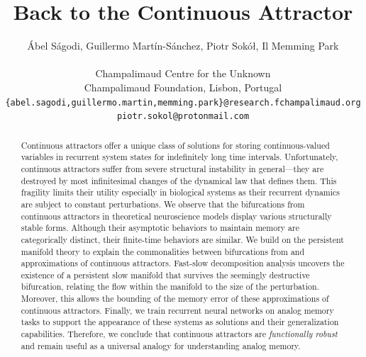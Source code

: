 \documentclass{article} %
\title{Back to the Continuous Attractor}
\author{
    \'Abel S\'agodi, Guillermo Mart\'in-S\'anchez, Piotr Sok\'o\l, Il Memming Park \\
    \\
    Champalimaud Centre for the Unknown\\
    Champalimaud Foundation, Lisbon, Portugal\\
    \texttt{\{abel.sagodi,guillermo.martin,memming.park\}@research.fchampalimaud.org}\\
    \texttt{piotr.sokol@protonmail.com}
}
\newcounter{ct}
\theoremstyle{definition}
\theoremstyle{remark}
\begin{document}


\maketitle

\begin{abstract}
Continuous attractors offer a unique class of solutions for storing continuous-valued variables in recurrent system states for indefinitely long time intervals.
Unfortunately, continuous attractors suffer from severe structural instability in general---they are destroyed by most infinitesimal changes of the dynamical law that defines them.
This fragility limits their utility especially in biological systems as their recurrent dynamics are subject to constant perturbations.
We observe that the bifurcations from continuous attractors in theoretical neuroscience models display various structurally stable forms.
Although their asymptotic behaviors to maintain memory are categorically distinct, their finite-time behaviors are similar.
We build on the persistent manifold theory to explain the commonalities between bifurcations from and approximations of continuous attractors.
Fast-slow decomposition analysis uncovers the existence of a persistent slow manifold that survives the seemingly destructive bifurcation, relating the flow within the manifold to the size of the perturbation. Moreover, this allows the bounding of the memory error of these approximations of continuous attractors. 
Finally, we train recurrent neural networks on analog memory tasks to support the appearance of these systems as solutions and their generalization capabilities.
Therefore, we conclude that continuous attractors are \emph{functionally robust} and remain useful as a universal analogy for understanding analog memory.
\end{abstract}
\end{document}
